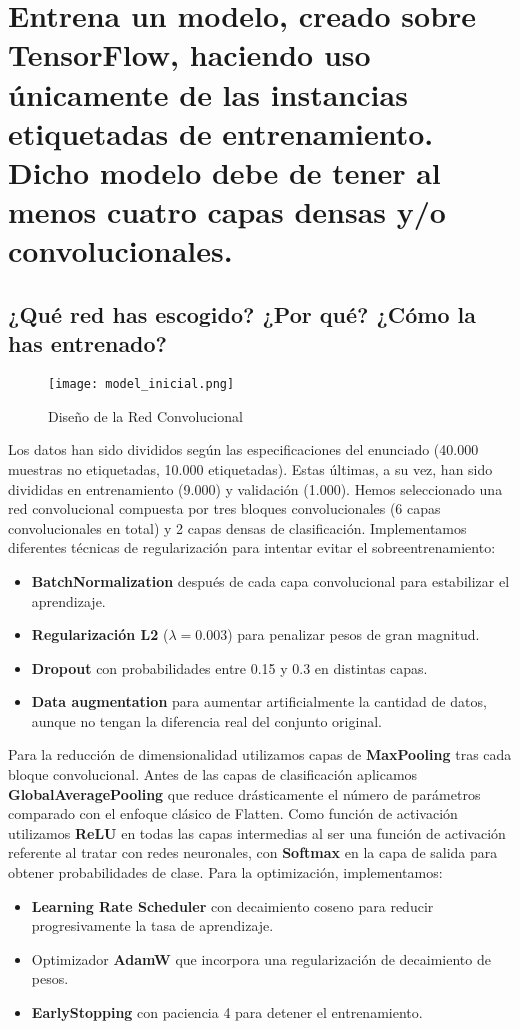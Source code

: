 \documentclass{article}
\begin{document}
\section{Entrena un modelo, creado sobre TensorFlow, haciendo uso únicamente de las instancias etiquetadas de entrenamiento. Dicho modelo debe de tener al menos cuatro capas densas y/o convolucionales.}
\subsection{¿Qué red has escogido? ¿Por qué? ¿Cómo la has entrenado?}

\begin{figure}[h!]
    \centering
    \texttt{[image: model\_inicial.png]}
    \caption{Diseño de la Red Convolucional}
    \label{fig:enter-label}
\end{figure}

Los datos han sido divididos según las especificaciones del enunciado (40.000 muestras no etiquetadas, 10.000 etiquetadas). Estas últimas, a su vez, han sido divididas en entrenamiento (9.000) y validación (1.000).
Hemos seleccionado una red convolucional compuesta por tres bloques convolucionales (6 capas convolucionales en total) y 2 capas densas de clasificación. Implementamos diferentes técnicas de regularización para intentar evitar el sobreentrenamiento:
\begin{itemize}
\item \textbf{BatchNormalization} después de cada capa convolucional para estabilizar el aprendizaje.
\item \textbf{Regularización L2} ($\lambda = 0.003$) para penalizar pesos de gran magnitud.
\item \textbf{Dropout} con probabilidades entre 0.15 y 0.3 en distintas capas.
\item \textbf{Data augmentation} para aumentar artificialmente la cantidad de datos, aunque no tengan la diferencia real del conjunto original.
\end{itemize}
Para la reducción de dimensionalidad utilizamos capas de \textbf{MaxPooling} tras cada bloque convolucional. Antes de las capas de clasificación aplicamos \textbf{GlobalAveragePooling} que reduce drásticamente el número de parámetros comparado con el enfoque clásico de Flatten.
Como función de activación utilizamos \textbf{ReLU} en todas las capas intermedias al ser una función de activación referente al tratar con redes neuronales, con \textbf{Softmax} en la capa de salida para obtener probabilidades de clase.
Para la optimización, implementamos:
\begin{itemize}
\item \textbf{Learning Rate Scheduler} con decaimiento coseno para reducir progresivamente la tasa de aprendizaje.
\item Optimizador \textbf{AdamW} que incorpora una regularización de decaimiento de pesos.
\item \textbf{EarlyStopping} con paciencia 4 para detener el entrenamiento.
\end{itemize}
\end{document}
